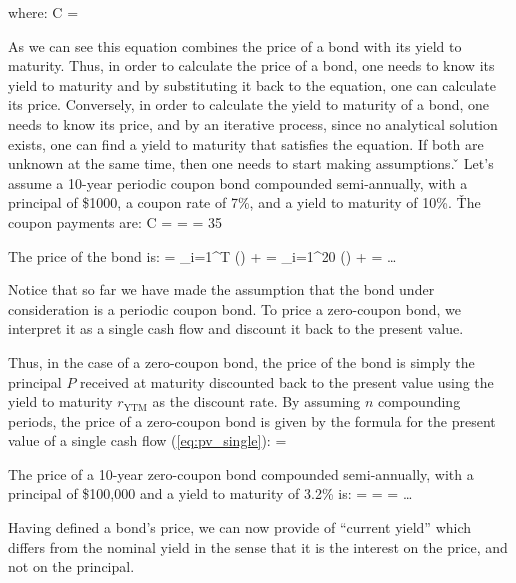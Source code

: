 where:
\bse
C = 
\ese

As we can see this equation combines the price of a bond with its yield to maturity. Thus, in order to calculate the
price of a bond, one needs to know its yield to maturity and by substituting it back to the equation, one can
calculate its price. Conversely, in order to calculate the yield to maturity of a bond, one needs to know its price,
and by an iterative process, since no analytical solution exists, one can find a yield to maturity that satisfies the
equation. If both are unknown at the same time, then one needs to start making assumptions. \v

\be
Let's assume a 10-year periodic coupon bond compounded semi-annually, with a principal of \$1000, a coupon rate of 7\%,
and a yield to maturity of 10\%. \v

The coupon payments are:
\bse
C =  =  = 35
\ese

The price of the bond is:
\bse
{} = \sum_{i=1}^T \Bigg(\Bigg) +  = \sum_{i=1}^{20} \Bigg(\Bigg) +
 = \ldots
\ese
\ee

Notice that so far we have made the assumption that the bond under consideration is a periodic coupon bond. To price a
zero-coupon bond, we interpret it as a single cash flow and discount it back to the present value.


Thus, in the case of a zero-coupon bond, the price of the bond is simply the principal $P$ received at maturity
discounted back to the present value using the yield to maturity $r_{\text{YTM}}$ as the discount rate. By
assuming $n$ compounding periods, the price of a zero-coupon bond is given by the formula for the present value of a
single cash flow (\ref{eq:pv_single}):
\bse
{} = 
\ese

\be
The price of a 10-year zero-coupon bond compounded semi-annually, with a principal of \$100,000 and a yield to maturity
of 3.2\%  is:
\bse
{} =  =  = \ldots
\ese
\ee

Having defined a bond's price, we can now provide of ``current yield'' which differs from the nominal yield in the
sense that it is the interest on the price, and not on the principal.

